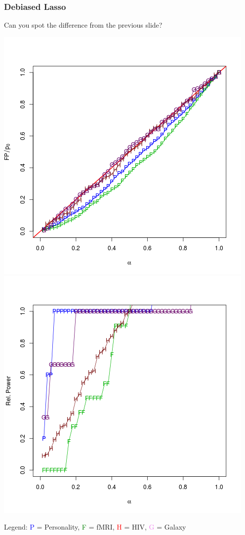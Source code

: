 \documentclass{beamer}
\begin{document}
\begin{frame}
\frametitle{Debiased Lasso}
Can you spot the difference from the previous slide?

\begin{center}
\includegraphics[scale = 0.3]{res_s_type1.png}
\includegraphics[scale = 0.3]{res_s_power.png}
\end{center}

Legend: \textcolor{blue}{P} = Personality, \textcolor{green}{F} = fMRI,
\textcolor{red}{H} = HIV, \textcolor{violet}{G} = Galaxy
\end{frame}
\end{document}
